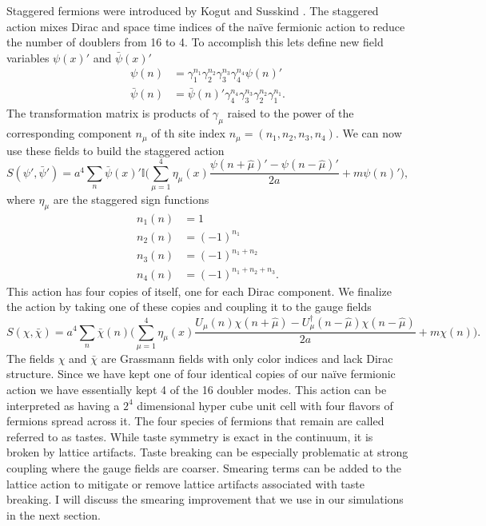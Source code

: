 Staggered fermions were introduced by Kogut and Susskind \cite{PhysRevD.11.395}.
The staggered action mixes Dirac and space time indices of the naïve fermionic action to reduce the number of doublers from 16 to 4.
To accomplish this lets define new field variables $\psi(x)'$ and $\bar{\psi}(x)'$
\begin{equation}
  \begin{aligned}
    \psi(n)&=\gamma_1^{n_1}\gamma_2^{n_2}\gamma_3^{n_3}\gamma_4^{n_4}\psi(n)'\\
    \bar{\psi}(n)&=\bar{\psi}(n)'\gamma_4^{n_4}\gamma_3^{n_3}\gamma_2^{n_2}\gamma_1^{n_1}.
  \end{aligned}
\end{equation}
The transformation matrix is products of $\gamma_\mu$ raised to the power of the corresponding component $n_\mu$ of th site index $n_\mu=(n_1,n_2,n_3,n_4)$.
We can now use these fields to build the staggered action
\begin{equation}
  S(\psi',\bar{\psi}')=a^4\sum_n \bar{\psi}(x)'\mathbb{I}\Big(\sum_{\mu=1}^4\eta_\mu(x)\frac{\psi(n+\hat{\mu})'-\psi(n-\hat{\mu})'}{2a}+m\psi(n)'\Big),
\end{equation}
where $\eta_\mu$ are the staggered sign functions
\begin{equation}
  \begin{aligned}
    n_1(n)&=1 \\
    n_2(n)&=(-1)^{n_1} \\
    n_3(n)&=(-1)^{n_1+n_2} \\
    n_4(n)&=(-1)^{n_1+n_2+n_3}.
  \end{aligned}
\end{equation}
This action has four copies of itself, one for each Dirac component.
We finalize the action by taking one of these copies and coupling it to the gauge fields
\begin{equation}
  S(\chi,\bar{\chi})=a^4\sum_n \bar{\chi}(n)\Big(\sum_{\mu=1}^4\eta_\mu(x)\frac{U_\mu(n)\chi(n+\hat{\mu})-U_\mu^\dagger(n-\hat{\mu})\chi(n-\hat{\mu})}{2a}+m\chi(n)\Big).
\end{equation}
The fields $\chi$ and $\bar{\chi}$ are Grassmann fields with only color indices and lack Dirac structure.
Since we have kept one of four identical copies of our naïve fermionic action we have essentially kept 4 of the 16 doubler modes.
This action can be interpreted as having a $2^4$ dimensional hyper cube unit cell with four flavors of fermions spread across it.
The four species of fermions that remain are called referred to as tastes.
While taste symmetry is exact in the continuum, it is broken by lattice artifacts.
Taste breaking can be especially problematic at strong coupling where the gauge fields are coarser.
Smearing terms can be added to the lattice action to mitigate or remove lattice artifacts associated with taste breaking.
I will discuss the smearing improvement that we use in our simulations in the next section.

